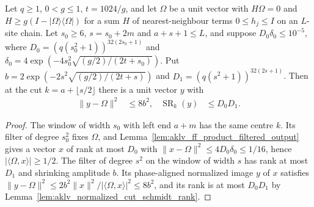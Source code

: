 \begin{lemma}
    \label{lem:aklv_ff_two_filter_approximant}
    \leanok
    Let $q\ge1$, $0<g\le1$, $t=1024/g$, and let $\Omega$ be a unit vector with
    $H\Omega=0$ and $H\ge g(I-|\Omega\rangle\langle\Omega|)$ for a sum $H$ of
    nearest-neighbour terms $0\le h_j\le I$ on an $L$-site chain. Let
    $s_0\ge6$, $s=s_0+2m$ and $a+s+1\le L$, and suppose
    $D_0\delta_0\le10^{-5}$, where $D_0=(q(s_0^2+1))^{32(2s_0+1)}$ and
    $\delta_0=4\exp(-4s_0^2\sqrt{(g/2)/(2t+s_0)})$. Put
    $b=2\exp(-2s^2\sqrt{(g/2)/(2t+s)})$ and
    $D_1=(q(s^2+1))^{32(2s+1)}$. Then at the cut $k=a+\lfloor s/2\rfloor$
    there is a unit vector $y$ with
    \begin{align*}
        \|y-\Omega\|^2         & \le8b^2,    &
        \operatorname{SR}_k(y) & \le D_0D_1.
    \end{align*}
\end{lemma}
\begin{proof}
    \leanok
    The window of width $s_0$ with left end $a+m$ has the same centre $k$.
    Its filter of degree $s_0^2$ fixes $\Omega$, and
    Lemma~\ref{lem:aklv_ff_product_filtered_output} gives a vector $x$ of rank
    at most $D_0$ with $\|x-\Omega\|^2\le4D_0\delta_0\le1/16$, hence
    $|\langle\Omega,x\rangle|\ge1/2$. The filter of degree $s^2$ on the
    window of width $s$ has rank at most $D_1$ and shrinking amplitude $b$.
    Its phase-aligned normalized image $y$ of $x$ satisfies
    $\|y-\Omega\|^2\le2b^2\|x\|^2/|\langle\Omega,x\rangle|^2\le8b^2$, and its
    rank is at most $D_0D_1$ by Lemma~\ref{lem:aklv_normalized_cut_schmidt_rank}.
\end{proof}

